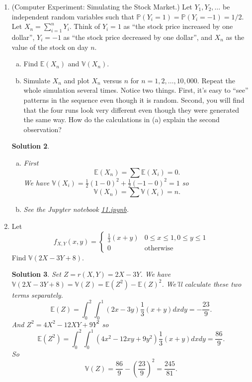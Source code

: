 \documentclass[10pt]{article}
\newtheorem*{sol}{Solution}
\renewcommand{\P}{\mathbb{P}}
\newcommand{\V}{\mathbb{V}}
\newcommand{\E}{\mathbb{E}}
\begin{document}
\begin{enumerate}
\begin{sol}
Finally then
\[
\V(Y) = \E(Y^2) - \E(Y)^2 = e^2-e.
\]
\end{sol}

\item[(11)]
(Computer Experiment: Simulating the Stock Market.) Let $Y_1,Y_2,\ldots$ be
independent random variables such that $\P(Y_i = 1) = \P(Y_i = -1) =
1/2$. Let $X_n = \sum_{i=1}^n Y_i$. Think of $Y_i=1$ as
``the stock price increased by one dollar'', $Y_i=-1$ as
``the stock price decreased by one dollar'',
and $X_n$ as the value of the stock on day $n$.
\begin{enumerate}[(a)]
\item Find $\E(X_n)$ and $\V(X_n)$.
\item Simulate $X_n$ and plot $X_n$ versus $n$ for $n = 1,2, \ldots, 10,000$.
Repeat the whole simulation several times. Notice two things. First, it's easy
to ``see'' patterns in the sequence even though it is random. Second,
you will find that the four runs look very different even though they
were generated the same way. How do the calculations in (a) explain
the second observation?
\end{enumerate}

\begin{sol}
\begin{enumerate}[(a)]
\item
First
\[
\E(X_n) = \sum \E(X_i) = 0.
\]
We have $\V(X_i)=\frac{1}{2}(1-0)^2 + \frac{1}{2}(-1-0)^2=1$ so
\[
\V(X_n) = \sum \V(X_i) = n.
\]
\item See the Jupyter notebook
\href{https://github.com/ajrasmus/some_of_statistics/blob/main/chapter_3/11.ipynb}{11.ipynb}.
\end{enumerate}
\end{sol}

\item[(15)]
Let
\[
f_{X,Y}(x,y) =
\begin{cases}
\frac{1}{3}(x+y) & 0\leq x \leq 1, 0\leq y \leq 1 \\
0 & \text{otherwise}
\end{cases}
\]
Find $\V(2X - 3Y + 8)$.

\begin{sol}
Set $Z=r(X,Y)=2X-3Y$. We have $\V(2X-3Y+8)=\V(Z)=\E(Z^2) - \E(Z)^2$.
We'll calculate these two terms separately.
\[
\E(Z) = \int_0^2 \int_0^1(2x-3y) \frac{1}{3}(x+y)dxdy=-\frac{23}{9}.
\]
And $Z^2=4X^2-12XY+9Y^2$ so
\[
\E(Z^2)=\int_0^2\int_0^1 (4x^2-12xy+9y^2)\frac{1}{3}(x+y)dxdy=\frac{86}{9}.
\]
So
\[
\V(Z)= \frac{86}{9} - \left(\frac{23}{9}\right)^2 = \frac{245}{81}.
\]
\end{sol}


\end{enumerate}
\end{document}
